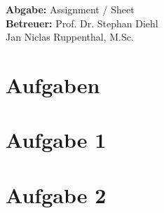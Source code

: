 \documentclass[11pt,a4paper]{article}
\title{\course}
\author{\studentname\\Matrikelnummer: \studentnumber\\\institute}
\date{\today}
\begin{document}
\maketitle

\begin{center}
    \textbf{Abgabe:} Assignment / Sheet \\
    \vspace{4mm}
    \textbf{Betreuer:} Prof. Dr. Stephan Diehl\\Jan Niclas Ruppenthal, M.Sc.
\end{center}

\bigskip

\section*{Aufgaben}

\section{Aufgabe 1}

\section{Aufgabe 2}
\end{document}
